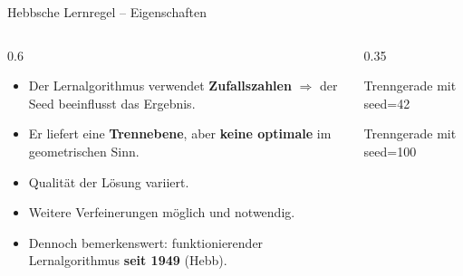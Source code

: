 \begin{frame}{Hebbsche Lernregel -- Eigenschaften}
\begin{columns}
\begin{column}{0.6\textwidth}
\begin{itemize}
    \item Der Lernalgorithmus verwendet \textbf{Zufallszahlen} $\Rightarrow$ der Seed beeinflusst das Ergebnis.
    \item Er liefert eine \textbf{Trennebene}, aber \textbf{keine optimale} im geometrischen Sinn.
    \item Qualität der Lösung variiert.
    \item Weitere Verfeinerungen möglich und notwendig.
    \item Dennoch bemerkenswert: funktionierender Lernalgorithmus \textbf{seit 1949} (Hebb).
\end{itemize}
\end{column}

\begin{column}{0.35\textwidth}
      \centering
      \scriptsize

Trenngerade mit seed=42
\vspace{0.5em}


Trenngerade mit seed=100
\end{column}

\end{columns}
\end{frame}

\makequizpage{\QUIZURL}{\QUIZQRCODE}{\QUIZIMAGE}
\makequestionspage{\FRAGENIMAGE}



